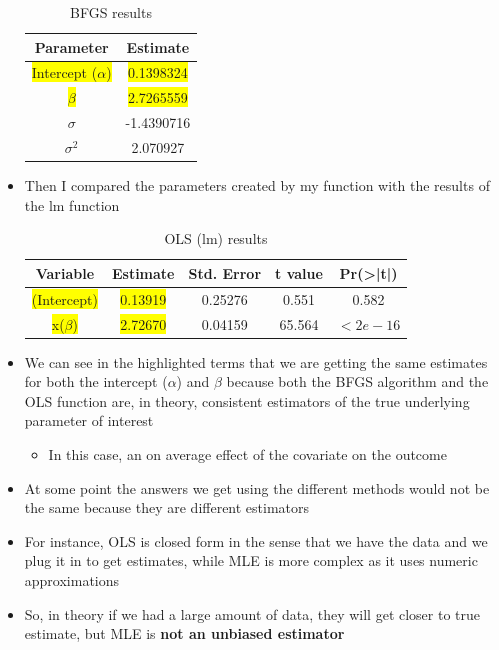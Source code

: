 \documentclass[12pt,letterpaper]{article}
\begin{document}
\begin{itemize}
		\begin{table}[h]
		\centering
		\caption{BFGS results}
		\label{tab:estimates}
		\begin{tabular}{|c|c|}
			\hline
			\textbf{Parameter} & \textbf{Estimate} \\
			\hline
			\colorbox{yellow}{Intercept ($\alpha$)} & \colorbox{yellow}{0.1398324} \\
			\colorbox{yellow}{$\beta$} & \colorbox{yellow}{2.7265559} \\
			$\sigma$ & -1.4390716 \\
			$\sigma^2$ & 2.070927 \\
			\hline
		\end{tabular}
	\end{table}
	
	\item Then I compared the parameters created by my function with the results of the lm function
	
	
	
	
	
	\begin{table}[h]
		\centering
		\caption{OLS (lm) results}
		\label{tab:coefficients}
		\begin{tabular}{|c|c|c|c|c|}
			\hline
			\textbf{Variable} & \textbf{Estimate} & \textbf{Std. Error} & \textbf{t value} & \textbf{Pr(\textgreater|t|)} \\
			\hline
			\colorbox{yellow}{(Intercept)} & \colorbox{yellow}{0.13919} & 0.25276 & 0.551 & 0.582 \\
			\colorbox{yellow}{x($\beta$)} & \colorbox{yellow}{2.72670} & 0.04159 & 65.564 & $<2e-16$ \\
			\hline
		\end{tabular}
	\end{table}
	
	\item We can see in the highlighted terms that we are getting the same estimates for both the intercept ($\alpha$) and $\beta$ because both the BFGS algorithm and the OLS function are, in theory, consistent estimators of the true underlying parameter of interest 
		\begin{itemize}
			\item In this case, an on average effect of the covariate on the outcome
		\end{itemize}
	\item At some point the answers we get using the different methods would not be the same because they are different estimators
	\item For instance, OLS is closed form in the sense that we have the data and we plug it in to get estimates, while MLE is more complex as it uses numeric approximations
	\item So, in theory if we had a large amount of data, they will get closer to true estimate, but MLE is \textbf{not an unbiased estimator}
	
\end{itemize}
\end{document}
